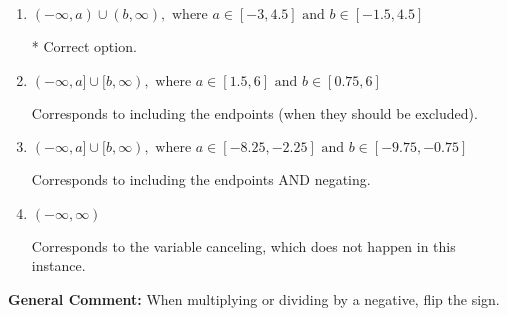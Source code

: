 \documentclass{extbook}[14pt]
\begin{document}
\begin{enumerate}
{\begin{enumerate}[label=\Alph*.]
Corresponds to inverting the inequality and negating the solution.
\item \( (-\infty, a) \cup (b, \infty), \text{ where } a \in [-3, 4.5] \text{ and } b \in [-1.5, 4.5] \)

 * Correct option.
\item \( (-\infty, a] \cup [b, \infty), \text{ where } a \in [1.5, 6] \text{ and } b \in [0.75, 6] \)

Corresponds to including the endpoints (when they should be excluded).
\item \( (-\infty, a] \cup [b, \infty), \text{ where } a \in [-8.25, -2.25] \text{ and } b \in [-9.75, -0.75] \)

Corresponds to including the endpoints AND negating.
\item \( (-\infty, \infty) \)

Corresponds to the variable canceling, which does not happen in this instance.
\end{enumerate}

\textbf{General Comment:} When multiplying or dividing by a negative, flip the sign.
}
\end{enumerate}
\end{document}
